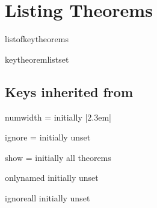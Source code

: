 \documentclass{ltxdoc}
\begin{document}
\section{Listing Theorems}

\begin{docCommand}{listofkeytheorems}
  {}

\end{docCommand}

\begin{docCommand}{keytheoremlistset}
  {}

\end{docCommand}

\begin{keythmscode}[]
\listofkeytheorems
\end{keythmscode}

\subsection{Keys inherited from }

\begin{docKey}{numwidth}
  {=}
  {initially |2.3em|}

\end{docKey}

\begin{docKey}{ignore}
  {=}
  {initially unset}

\end{docKey}

\begin{docKey}{show}
  {=}
  {initially all theorems}

\end{docKey}

\begin{docKey}{onlynamed}
  {}
  {initially unset}

\end{docKey}

\begin{docKey}{ignoreall}
  {}
  {initially unset}
  
\begin{keythmscode}[]
\listofkeytheorems[ignoreall,show=theorem]
\listofkeytheorems[
  ignoreall, show=conjecture,
  title=List of Conjectures
  ]
\end{keythmscode}

\end{docKey}
\end{document}
